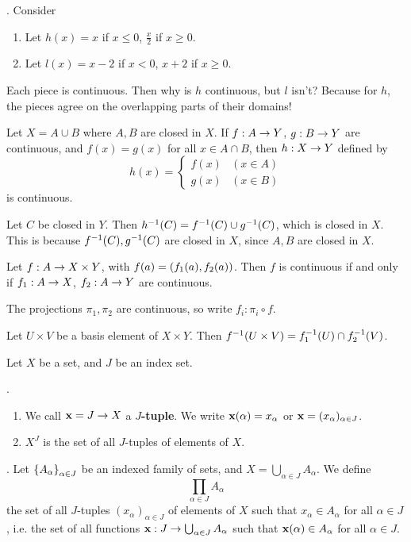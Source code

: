 \ex. Consider
\begin{enumerate}
    \item Let \(h(x) = x\) if \(x \leq 0\), \(\frac{x}{2}\) if \(x \geq 0\).
    \item Let \(l(x) = x - 2\) if \(x < 0\), \(x + 2\) if \(x \geq 0\).
\end{enumerate}
Each piece is continuous. Then why is \(h\) continuous, but \(l\) isn't? Because for \(h\), the pieces agree on the overlapping parts of their domains!

  Let \(X = A \cup B\) where \(A, B\) are closed in \(X\). If \(f : A \ra Y\), \(g : B \ra Y\) are continuous, and \(f(x) = g(x)\) for all \(x \in A \cap B\), then \(h: X \ra Y\) defined by
\[
    h(x) = \begin{cases}
        f(x) & (x \in A) \\ g(x) & (x \in B)
    \end{cases}
\]
is continuous.

\pf Let \(C\) be closed in \(Y\). Then \(h\inv(C) = f\inv(C) \cup g\inv(C)\), which is closed in \(X\). This is because \(f\inv(C), g\inv(C)\) are closed in \(X\), since \(A, B\) are closed in \(X\).

  Let \(f : A \ra X \times Y\), with \(f(a) = \paren{f_1(a), f_2(a)}\). Then \(f\) is continuous if and only if \(f_1 : A \ra X\), \(f_2 : A \ra Y\) are continuous.

\pf \note{\mimp} The projections \(\pi_1, \pi_2\) are continuous, so write \(f_i: \pi_i \circ f\).

\note{\mimpd} Let \(U \times V\) be a basis element of \(X \times Y\). Then \(f\inv(U \times V) = f_1\inv(U) \cap f_2\inv(V)\).


Let \(X\) be a set, and \(J\) be an index set.

.
\begin{enumerate}
    \item We call \(\bf{x} = J \ra X\) a \textbf{\(J\)-tuple}. We write \(\bf{x}(\alpha) = x_\alpha\) or \(\bf{x} = (x_\alpha)_{\alpha \in J}\).
    \item \(X^J\) is the set of all \(J\)-tuples of elements of \(X\).
\end{enumerate}

. Let \(\seq{A_\alpha}_{\alpha \in J}\) be an indexed family of sets, and \(X = \bigcup_{\alpha \in J} A_\alpha\). We define
\[
    \prod_{\alpha \in J} A_\alpha
\]
the set of all \(J\)-tuples \((x_\alpha)_{\alpha \in J}\) of elements of \(X\) such that \(x_\alpha \in A_\alpha\) for all \(\alpha \in J\), i.e. the set of all functions \(\bf{x}: J \ra \bigcup_{\alpha \in J} A_\alpha\) such that \(\bf{x}(\alpha) \in A_\alpha\) for all \(\alpha \in J\).

